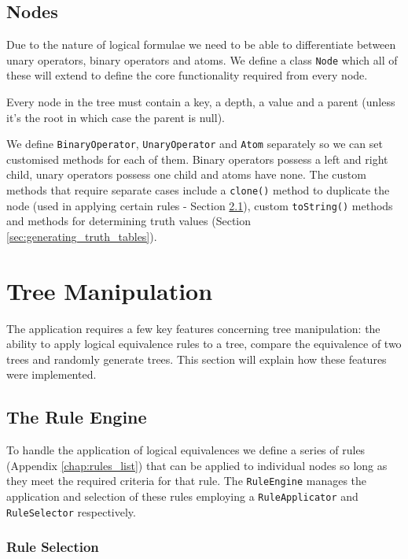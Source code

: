 \documentclass[draft]{report}
\begin{document}
\section{Nodes}

Due to the nature of logical formulae we need to be able to differentiate between unary operators, binary operators and atoms. We define a class {\tt Node} which all of these will extend to define the core functionality required from every node.

Every node in the tree must contain a key, a depth, a value and a parent (unless it's the root in which case the parent is null).

We define {\tt BinaryOperator}, {\tt UnaryOperator} and {\tt Atom} separately so we can set customised methods for each of them. Binary operators possess a left and right child, unary operators possess one child and atoms have none. The custom methods that require separate cases include a {\tt clone()} method to duplicate the node (used in applying certain rules - Section \ref{sec:the_rule_engine}), custom {\tt toString()} methods and methods for determining truth values (Section \ref{sec:generating_truth_tables}).

\chapter{Tree Manipulation}
\label{chap:tree_manipulation}

The application requires a few key features concerning tree manipulation: the ability to apply logical equivalence rules to a tree, compare the equivalence of two trees and randomly generate trees. This section will explain how these features were implemented.

\section{The Rule Engine}
\label{sec:the_rule_engine}

To handle the application of logical equivalences we define a series of rules (Appendix \ref{chap:rules_list}) that can be applied to individual nodes so long as they meet the required criteria for that rule. The {\tt RuleEngine} manages the application and selection of these rules employing a {\tt RuleApplicator} and {\tt RuleSelector} respectively.

\subsection{Rule Selection}
\label{sub:rule_selection}
\end{document}
